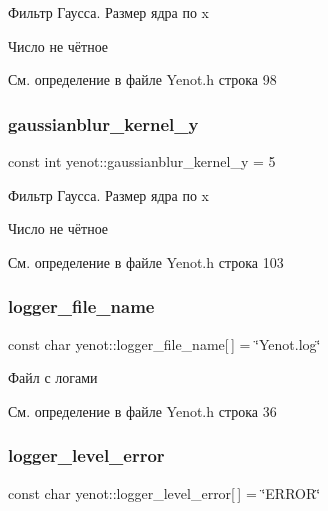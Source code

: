 Фильтр Гаусса. Размер ядра по x

Число не чётное 

См. определение в файле Yenot.\+h строка 98

\mbox{\label{namespaceyenot_a9f129e682fdc00d2869d4ed69a4c6aa7}} 
\subsubsection{\texorpdfstring{gaussianblur\+\_\+kernel\+\_\+y}{gaussianblur\_kernel\_y}}
{\footnotesize\ttfamily const int yenot\+::gaussianblur\+\_\+kernel\+\_\+y = 5}

Фильтр Гаусса. Размер ядра по x

Число не чётное 

См. определение в файле Yenot.\+h строка 103

\mbox{\label{namespaceyenot_ab82af39640477c63378716f6699d49fe}} 
\subsubsection{\texorpdfstring{logger\+\_\+file\+\_\+name}{logger\_file\_name}}
{\footnotesize\ttfamily const char yenot\+::logger\+\_\+file\+\_\+name\mbox{[}$\,$\mbox{]} = \char`\"{}Yenot.\+log\char`\"{}}



Файл с логами 



См. определение в файле Yenot.\+h строка 36

\mbox{\label{namespaceyenot_a9624d76c2385fbb9861e403225b1d698}} 
\subsubsection{\texorpdfstring{logger\+\_\+level\+\_\+error}{logger\_level\_error}}
{\footnotesize\ttfamily const char yenot\+::logger\+\_\+level\+\_\+error\mbox{[}$\,$\mbox{]} = \char`\"{}E\+R\+R\+OR\char`\"{}}



